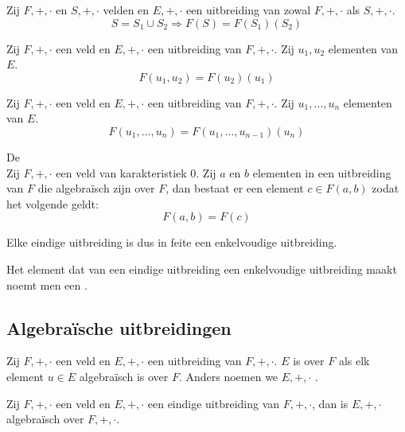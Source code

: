 \documentclass[main.tex]{subfiles}
\begin{document}

\begin{st}
  Zij $F,+,\cdot$ en $S,+,\cdot$ velden en $E,+,\cdot$ een uitbreiding van zowal $F,+,\cdot$ als $S,+,\cdot$.
  \[ S = S_{1} \cup S_{2} \Rightarrow F(S) = F(S_{1})(S_{2}) \]
\end{st}

\begin{st}
  Zij $F,+,\cdot$ een veld en $E,+,\cdot$ een uitbreiding van $F,+,\cdot$.
  Zij $u_{1},u_{2}$ elementen van $E$.
  \[ F(u_{1},u_{2}) = F(u_{2})(u_{1})\]
\end{st}

\begin{st}
  Zij $F,+,\cdot$ een veld en $E,+,\cdot$ een uitbreiding van $F,+,\cdot$.
  Zij $u_{1},\dotsc,u_{n}$ elementen van $E$.
  \[ F(u_{1},\dotsc,u_{n}) = F(u_{1},\dotsc,u_{n-1})(u_{n})\]
\end{st}

\begin{st}
  De \\
  Zij $F,+,\cdot$ een veld van karakteristiek $0$.
  Zij $a$ en $b$ elementen in een uitbreiding van $F$ die algebra\"isch zijn over $F$,
  dan bestaat er een element $c\in F(a,b)$ zodat het volgende geldt:
  \[ F(a,b) = F(c) \]
  \zb
\end{st}

\begin{opm}
  Elke eindige uitbreiding is dus in feite een enkelvoudige uitbreiding.
\end{opm}

\begin{de}
  Het element dat van een eindige uitbreiding een enkelvoudige uitbreiding maakt noemt men een .
\end{de}

\subsection{Algebra\"ische uitbreidingen}
\label{sec:algebr-uitbr}
\begin{de}
  Zij $F,+,\cdot$ een veld en $E,+,\cdot$ een uitbreiding van $F,+,\cdot$.
  $E$ is  over $F$ als elk element $u\in E$ algebra\"isch is over $F$.
  Anders noemen we $E,+,\cdot$ .
\end{de}

\begin{pr}
  Zij $F,+,\cdot$ een veld en $E,+,\cdot$ een eindige uitbreiding van $F,+,\cdot$, dan is $E,+,\cdot$ algebra\"isch over $F,+,\cdot$.
\end{pr}
\end{document}
